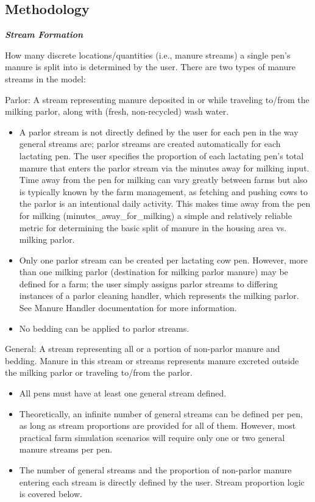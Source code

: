 \begin{refsection}
\vspace{0.2cm}





\subsection{Methodology}
\textbf{\textit{Stream Formation}}
\vspace{0.25cm}

How many discrete locations/quantities (i.e., manure streams) a single pen’s manure is split into is determined by the user. There are two types of manure streams in the model: 
\vspace{0.5cm}

Parlor: A stream representing manure deposited in or while traveling to/from the milking parlor, along with (fresh, non-recycled) wash water. 
    \begin{itemize}
        \item A parlor stream is not directly defined by the user for each pen in the way general streams are; parlor streams are created automatically for each lactating pen. The user specifies the proportion of each lactating pen’s total manure that enters the parlor stream via the minutes away for milking input. Time away from the pen for milking can vary greatly between farms but also is typically known by the farm management, as fetching and pushing cows to the parlor is an intentional daily activity. This makes time away from the pen for milking (minutes\_away\_for\_milking) a simple and relatively reliable metric for determining the basic split of manure in the housing area vs. milking parlor. 
        \item Only one parlor stream can be created per lactating cow pen. However, more than one milking parlor (destination for milking parlor manure) may be defined for a farm; the user simply assigns parlor streams to differing instances of a parlor cleaning handler, which represents the milking parlor. See Manure Handler documentation for more information. 
        \item No bedding can be applied to parlor streams.
    \end{itemize}

General: A stream representing all or a portion of non-parlor manure and bedding. Manure in this stream or streams represents manure excreted outside the milking parlor or traveling to/from the parlor. 
    \begin{itemize}
        \item All pens must have at least one general stream defined. 
        \item Theoretically, an infinite number of general streams can be defined per pen, as long as stream proportions are provided for all of them. However, most practical farm simulation scenarios will require only one or two general manure streams per pen.
        \item The number of general streams and the proportion of non-parlor manure entering each stream is directly defined by the user. Stream proportion logic is covered below.
    \end{itemize}


\end{refsection}
